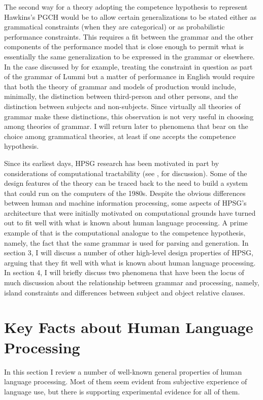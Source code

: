 \documentclass[a4paper]{article}
\begin{document}
The second way for a theory adopting the competence hypothesis to represent Hawkins's PGCH would be to allow certain generalizations to be stated either as grammatical constraints (when they are categorical) or as probabilistic performance constraints.  This requires a fit between the grammar and the other components of the performance model that is close enough to permit what is essentially the same generalization to be expressed in the grammar or elsewhere.  In the case discussed by \citeauthor{BresnanEtAl2001} for example, treating the constraint in question as part of the grammar of Lummi but a matter of performance in English would require that both the theory of grammar and models of production would include, minimally, the distinction between third-person and other persons, and the distinction between subjects and non-subjects.  Since virtually all theories of grammar make these distinctions, this observation is not very useful in choosing among theories of grammar.  I will return later to phenomena that bear on the choice among grammatical theories, at least if one accepts the competence hypothesis.

Since its earliest days, HPSG research has been motivated in part by considerations of computational tractability (see , for discussion).  Some of the design features of the theory can be traced back to the need to build a system that could run on the computers of the 1980s.  Despite the obvious differences between human and machine information processing, some aspects of HPSG's architecture that were initially motivated on computational grounds have turned out to fit well with what is known about human language processing.  A prime example of that is the computational analogue to the competence hypothesis, namely, the fact that the same grammar is used for parsing and generation. In section 3, I will discuss a number of other high-level design properties of HPSG, arguing that they fit well with what is known about human language processing.  In section 4, I will briefly discuss two phenomena that have been the locus of much discussion about the relationship between grammar and processing, namely, island constraints and differences between subject and object relative clauses.

\section{Key Facts about Human Language Processing}

In this section I review a number of well-known general properties of human language processing.  Most of them seem evident from subjective experience of language use, but there is supporting experimental evidence for all of them.  
\end{document}
